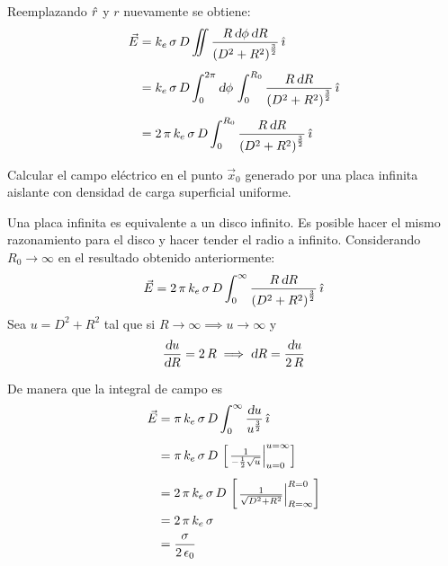 \begin{mdframed}[style=ExampleFrame]
    Reemplazando $\hat{r}$ y $r$ nuevamente se obtiene:
    \begin{align*}
        \vec{E} &= k_e \, \sigma \, D \iint \frac{R \, \textsl{d} \phi \, \textsl{d} R}{\left(D^2 + R^2\right)^{\frac{3}{2}}} \, \hat{\imath}
        \\[1ex]
        &= k_e \, \sigma \, D \int_0^{2\pi} \textsl{d} \phi \, \int_0^{R_0} \frac{R \, \textsl{d} R}{\left(D^2 + R^2\right)^{\frac{3}{2}}} \, \hat{\imath}
        \\[1ex]
        &= 2 \, \pi \, k_e \, \sigma \, D \int_0^{R_0} \frac{R \, \textsl{d} R}{\left(D^2 + R^2\right)^{\frac{3}{2}}} \, \hat{\imath}
    \end{align*}
\end{mdframed}

\begin{mdframed}[style=ExampleFrame]
    \begin{example}
        \label{eg:elec-placa}
    \end{example}
    \begin{formatI}
        Calcular el campo eléctrico en el punto $\vec{x}_0$ generado por una placa infinita aislante con densidad de carga superficial uniforme.
    \end{formatI}
    \begin{center}
        \def\svgwidth{\linewidth}
        
    \end{center}
    Una placa infinita es equivalente a un disco infinito.
    Es posible hacer el mismo razonamiento para el disco y hacer tender el radio a infinito.
    Considerando $R_0 \to \infty$ en el resultado obtenido anteriormente:
    \begin{equation*}
        \vec{E} = 2 \, \pi \, k_e \, \sigma \, D \int_0^\infty \frac{R \, \textsl{d} R}{\left(D^2 + R^2\right)^{\frac{3}{2}}} \, \hat{\imath}
    \end{equation*}
    Sea $u = D^2 + R^2$ tal que si $R \to \infty \implies u \to \infty$ y
    \begin{equation*}
        \frac{\textsl{d} u}{\textsl{d} R} = 2 \, R \implies \textsl{d} R = \frac{\textsl{d} u}{2 \, R}
    \end{equation*}

    De manera que la integral de campo es
    \begin{align*}
        \vec{E} &= \pi \, k_e \, \sigma \, D \int_0^\infty \frac{\textsl{d} u}{u^{\frac{3}{2}}} \, \hat{\imath}
        \\[1ex]
        &= \pi \, k_e \, \sigma \, D \, \begin{bmatrix} \left. \frac{1}{-\frac{1}{2} \sqrt{u}} \right|_{u=0}^{u=\infty} \end{bmatrix}
        \\[1ex]
        &= 2 \, \pi \, k_e \, \sigma \, D \, \begin{bmatrix} \left. \frac{1}{\sqrt{D^2 + R^2}} \right|_{R=\infty}^{R=0} \end{bmatrix}
        \\
        &= 2 \, \pi \, k_e \, \sigma
        \\
        &= \frac{\sigma}{2 \, \epsilon_0}
    \end{align*}


\end{mdframed}

